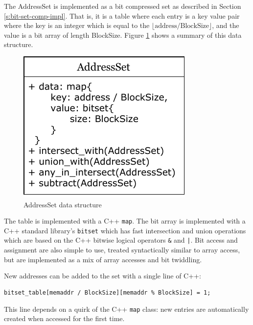 \documentclass[12pt,twoside]{reedthesis}
\begin{document}
			
			
			The AddressSet is implemented as a bit compressed set as described in Section \ref{s:bit-set-comp-impl}. That is, it is a table where each entry is a key value pair where the key is an integer which is equal to the $\lfloor \text{address}/\text{BlockSize} \rfloor$, and the value is a bit array of length BlockSize. Figure \ref{fig:bitset} shows a summary of this data structure. 
			
			
			\begin{figure}[h]
				\caption{AddressSet data structure}
				\label{fig:bitset}
				\includegraphics[scale=1.0]{bit_data.pdf}
			\end{figure}
		
			The table is implemented with a C++ \texttt{map}.
			The bit array is implemented with a C++ standard library's \texttt{bitset} which has fast intersection and union operations which are based on the C++ bitwise logical operators \texttt{\&} and \texttt{|}. Bit access and assignment are also simple to use, treated syntactically similar to array access, but are implemented as a mix of array accesses and bit twiddling. %
			
			New addresses can be added to the set with a single line of C++:
\begin{verbatim}
bitset_table[memaddr / BlockSize][memaddr % BlockSize] = 1;
\end{verbatim}
			This line depends on a quirk of the C++ \texttt{map} class: new entries are automatically created when accessed for the first time. 
			
\end{document}
